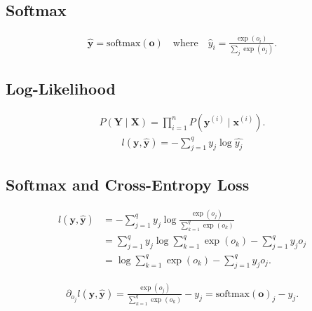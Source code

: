 \documentclass[a4paper,12pt]{article}
\theoremstyle{definition}
\begin{document}
\subsection*{Softmax}
\begin{equation*}
    \begin{aligned}
        \hat{\mathbf{y}} = \mathrm{softmax}(\mathbf{o}) \quad \text{where} \quad \hat{y}_i = \frac{\exp(o_i)}{\sum_j \exp(o_j)}.
    \end{aligned}
\end{equation*}

\subsection*{Log-Likelihood}
\begin{equation*}
    \begin{aligned}
        P(\mathbf{Y} \mid \mathbf{X}) = \prod_{i=1}^n P(\mathbf{y}^{(i)} \mid \mathbf{x}^{(i)}).
    \end{aligned}
\end{equation*}
\begin{equation*}
    \begin{aligned}
        l(\mathbf{y},\mathbf{\hat{y}}) = -\sum_{j=1}^{q}y_j \log \hat{y_j}
    \end{aligned}
\end{equation*}

\subsection*{Softmax and Cross-Entropy Loss}
\begin{equation*}
    \begin{aligned}
        l(\mathbf{y}, \hat{\mathbf{y}}) & =  - \sum_{j=1}^q y_j \log \frac{\exp(o_j)}{\sum_{k=1}^q \exp(o_k)}   \\
                                        & = \sum_{j=1}^q y_j \log \sum_{k=1}^q \exp(o_k) - \sum_{j=1}^q y_j o_j \\
                                        & = \log \sum_{k=1}^q \exp(o_k) - \sum_{j=1}^q y_j o_j.
    \end{aligned}
\end{equation*}

\begin{equation*}
    \begin{aligned}
        \partial_{o_j} l(\mathbf{y}, \hat{\mathbf{y}}) = \frac{\exp(o_j)}{\sum_{k=1}^q \exp(o_k)} - y_j = \mathrm{softmax}(\mathbf{o})_j - y_j.
    \end{aligned}
\end{equation*}
\end{document}
